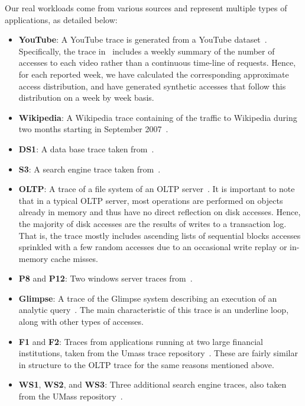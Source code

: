 \documentclass[10pt,a4paper]{article}
\begin{document}
Our real workloads come from various sources and represent multiple types of applications, as detailed below:
\begin{itemize}
\item
\textbf{YouTube}: A YouTube trace is generated from a YouTube dataset~\cite{YouTubeDataSet}.
Specifically, the trace in~\cite{YouTubeDataSet} includes a weekly summary of the number of accesses to each video rather than a continuous time-line of requests.
Hence, for each reported week, we have calculated the corresponding approximate access distribution, and have generated synthetic accesses that follow this distribution on a week by week basis.

\item
\textbf{Wikipedia}: A Wikipedia trace containing  of the traffic to Wikipedia during two months starting in September 2007~\cite{WikiTrace}.

\item
\textbf{DS1}: A data base trace taken from~\cite{ARC}.

\item
\textbf{S3}: A search engine trace taken from~\cite{ARC}.

\item
\textbf{OLTP}: A trace of a file system of an OLTP server~\cite{ARC}.
It is important to note that in a typical OLTP server, most operations are performed on objects already in memory and thus have no direct reflection on disk accesses.
Hence, the majority of disk accesses are the results of writes to a transaction log.
That is, the trace mostly includes ascending lists of sequential blocks accesses sprinkled with a few random accesses due to an occasional write replay or in-memory cache misses.

\item
\textbf{P8} and \textbf{P12}: Two windows server traces from~\cite{ARC}.

\item
\textbf{Glimpse}: A trace of the Glimpse system describing an execution of an analytic query~\cite{LIRS}.
The main characteristic of this trace is an underline loop, along with other types of accesses.

\item
\textbf{F1} and \textbf{F2}: Traces from applications running at two large financial institutions, taken from the Umass trace repository~\cite{UMAS}.
These are fairly similar in structure to the OLTP trace for the same reasons mentioned above.

\item
\textbf{WS1}, \textbf{WS2}, and \textbf{WS3}: Three additional search engine traces, also taken from the UMass repository~\cite{UMAS}.
\end{itemize}
\end{document}
